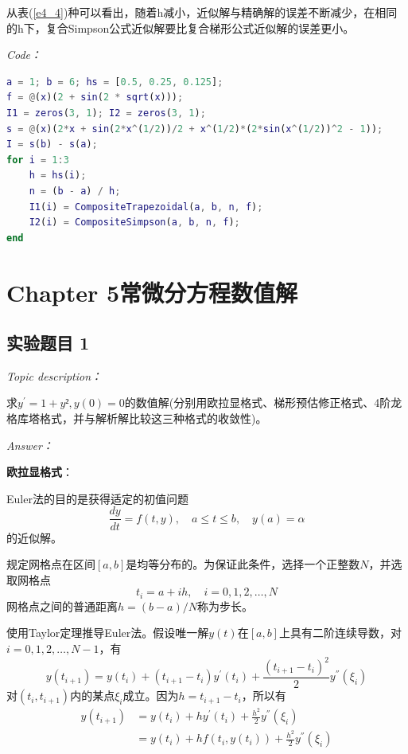 \documentclass[12pt]{ctexart}
\begin{document}
	从表(\ref{e4_4})种可以看出，随着h减小，近似解与精确解的误差不断减少，在相同 的h下，复合Simpson公式近似解要比复合梯形公式近似解的误差更小。

	\textit{Code：}
	
\begin{lstlisting}[language = MATLAB]
% 第4章 第4题
a = 1; b = 6; hs = [0.5, 0.25, 0.125];
f = @(x)(2 + sin(2 * sqrt(x)));
I1 = zeros(3, 1); I2 = zeros(3, 1);
s = @(x)(2*x + sin(2*x^(1/2))/2 + x^(1/2)*(2*sin(x^(1/2))^2 - 1));
I = s(b) - s(a);
for i = 1:3
	h = hs(i);
	n = (b - a) / h;
	I1(i) = CompositeTrapezoidal(a, b, n, f);
	I2(i) = CompositeSimpson(a, b, n, f);
end
\end{lstlisting}

\newpage
	
	
\newpage
	\section{Chapter 5\quad 常微分方程数值解}
	\label{sec:5}	
	
	\subsection{实验题目 1}
	\textit{Topic description：}
	
	求$y^{'}=1+y²,y(0)=0$的数值解(分别用欧拉显格式、梯形预估修正格式、4阶龙格库塔格式，并与解析解比较这三种格式的收敛性)。
	
	\textit{Answer：}
	
	\textbf{欧拉显格式}：
	
	Euler法的目的是获得适定的初值问题$$\frac{dy}{dt}=f(t,y),\quad a\leq t\leq b,\quad y(a)=\alpha$$的近似解。
	
	规定网格点在区间$[a,b]$是均等分布的。为保证此条件，选择一个正整数$N$，并选取网格点$$t_i=a+ih,\quad i=0,1,2,\dots,N$$网格点之间的普通距离$h=(b-a)/N$称为步长。
	
	使用Taylor定理推导Euler法。假设唯一解$y(t)$在$[a,b]$上具有二阶连续导数，对$i=0,1,2,\dots,N-1$，有$$y(t_{i+1})=y(t_i)+(t_{i+1}-t_i)y^{'}(t_i)+\frac{(t_{i+1}-t_i)^2}{2}y^{''}(\xi_i)$$对$(t_i,t_{i+1})$内的某点$\xi_i$成立。因为$h=t_{i+1}-t_i$，所以有
	\begin{equation*}
	\begin{aligned}
	y(t_{i+1})&=y(t_i)+hy^{'}(t_i)+\frac{h^2}{2}y^{''}(\xi_i) \\
	&=y(t_i)+hf(t_i,y(t_i))+\frac{h^2}{2}y^{''}(\xi_i)
	\end{aligned}
	\end{equation*}
	
\end{document}
